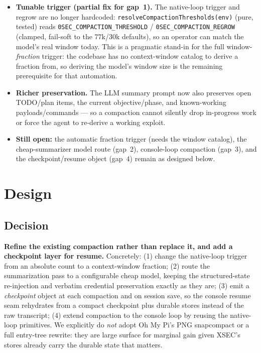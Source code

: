 \documentclass[11pt]{article}
\begin{document}
\begin{itemize}[leftmargin=1.6em]
\item \textbf{Tunable trigger (partial fix for gap~1).} The native-loop trigger
and regrow are no longer hardcoded: \texttt{resolveCompactionThresholds(env)}
(pure, tested) reads \texttt{0SEC\_COMPACTION\_THRESHOLD} /
\texttt{0SEC\_COMPACTION\_REGROW} (clamped, fail-soft to the $77$k/$30$k
defaults), so an operator can match the model's real window today. This is a
pragmatic stand-in for the full window-\emph{fraction} trigger: the codebase has
no context-window catalog to derive a fraction from, so deriving the model's
window size is the remaining prerequisite for that automation.
\item \textbf{Richer preservation.} The LLM summary prompt now also preserves
open TODO/plan items, the current objective/phase, and known-working
payloads/commands --- so a compaction cannot silently drop in-progress work or
force the agent to re-derive a working exploit.
\item \textbf{Still open:} the automatic fraction trigger (needs the window
catalog), the cheap-summarizer model route (gap~2), console-loop compaction
(gap~3), and the checkpoint/resume object (gap~4) remain as designed below.
\end{itemize}

\section{Design}

\subsection{Decision}

\textbf{Refine the existing compaction rather than replace it, and add a
checkpoint layer for resume.} Concretely: (1) change the native-loop trigger from
an absolute count to a context-window fraction; (2) route the summarization pass
to a configurable cheap model, keeping the structured-state re-injection and
verbatim credential preservation exactly as they are; (3) emit a
\emph{checkpoint} object at each compaction and on session save, so the console
resume seam rehydrates from a compact checkpoint plus durable stores instead of
the raw transcript; (4) extend compaction to the console loop by reusing the
native-loop primitives. We explicitly do \emph{not} adopt Oh My Pi's PNG
snapcompact or a full entry-tree rewrite: they are large surface for marginal
gain given XSEC's stores already carry the durable state that matters.
\end{document}
